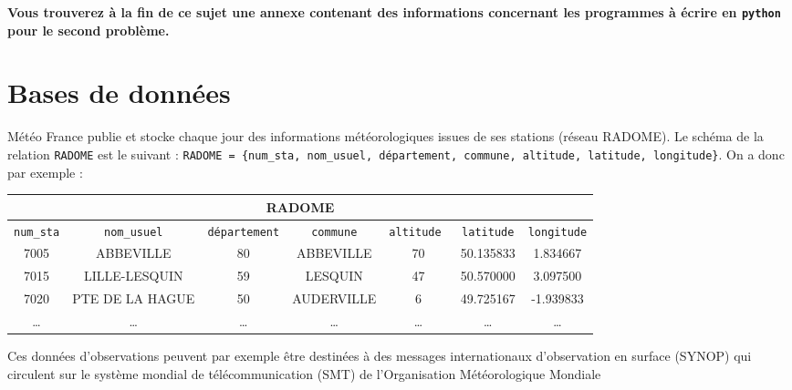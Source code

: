 \ifprof
\else

\textbf{Vous trouverez à la fin de ce sujet une annexe contenant des informations concernant les programmes à écrire en 
\texttt{python} pour le second problème.}

\fi


\section{Bases de données}

\ifprof
\else
Météo France publie et stocke chaque jour des informations météorologiques issues de ses stations (réseau RADOME).
Le schéma de la relation \texttt{RADOME} est le suivant : 
\texttt{RADOME = \{num\_sta, nom\_usuel, département, commune, altitude, latitude, longitude\}}. On a donc par exemple :
\begin{center}
\begin{tabular}{ccccccc}
\hline
\multicolumn{7}{c}{RADOME} \\
\hline\texttt{num\_sta} & \texttt{nom\_usuel} & \texttt{département} & \texttt{commune} & \texttt{altitude	} 
& \texttt{latitude} & \texttt{longitude} \\
\hline\hline
7005&	ABBEVILLE&	80&	ABBEVILLE&	70&	50.135833&	1.834667 \\
7015&	LILLE-LESQUIN&	59&	LESQUIN&	47&	50.570000&	3.097500\\
7020&	PTE DE LA HAGUE&	50&	AUDERVILLE	&6&	49.725167&	-1.939833\\
…&	…&	…&	…&	…&	…&	… \\
\hline
\end{tabular}
\end{center}
Ces données d'observations peuvent par exemple être destinées à des messages internationaux d’observation en surface 
(SYNOP) qui circulent sur le système mondial de télécommunication (SMT) de l’Organisation Météorologique Mondiale 
